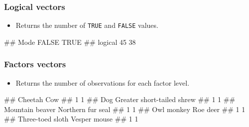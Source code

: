 \documentclass[
]{book}
\newenvironment{Shaded}{\begin{snugshade}}{\end{snugshade}}
\newcommand{\DecValTok}[1]{\textcolor[rgb]{0.00,0.00,0.81}{#1}}
\newcommand{\FunctionTok}[1]{\textcolor[rgb]{0.13,0.29,0.53}{\textbf{#1}}}
\newcommand{\NormalTok}[1]{#1}
\newcommand{\SpecialCharTok}[1]{\textcolor[rgb]{0.81,0.36,0.00}{\textbf{#1}}}
\providecommand{\tightlist}{%
  \setlength{\itemsep}{0pt}\setlength{\parskip}{0pt}}
\begin{document}
\subsubsection{Logical vectors}\label{logical-vectors}

\begin{itemize}
\tightlist
\item
  Returns the number of \texttt{TRUE} and \texttt{FALSE} values.
\end{itemize}

\begin{Shaded}
\end{Shaded}

\begin{Shaded}
\begin{Highlighting}[]
\NormalTok{\#\#    Mode   FALSE    TRUE }
\NormalTok{\#\# logical      45      38}
\end{Highlighting}
\end{Shaded}

\subsubsection{Factors vectors}\label{factors-vectors}

\begin{itemize}
\tightlist
\item
  Returns the number of observations for each factor level.
\end{itemize}

\begin{Shaded}
\end{Shaded}

\begin{Shaded}
\begin{Highlighting}[]
\NormalTok{\#\#                    Cheetah                        Cow }
\NormalTok{\#\#                          1                          1 }
\NormalTok{\#\#                        Dog Greater short{-}tailed shrew }
\NormalTok{\#\#                          1                          1 }
\NormalTok{\#\#            Mountain beaver          Northern fur seal }
\NormalTok{\#\#                          1                          1 }
\NormalTok{\#\#                 Owl monkey                   Roe deer }
\NormalTok{\#\#                          1                          1 }
\NormalTok{\#\#           Three{-}toed sloth               Vesper mouse }
\NormalTok{\#\#                          1                          1}
\end{Highlighting}
\end{Shaded}
\end{document}
